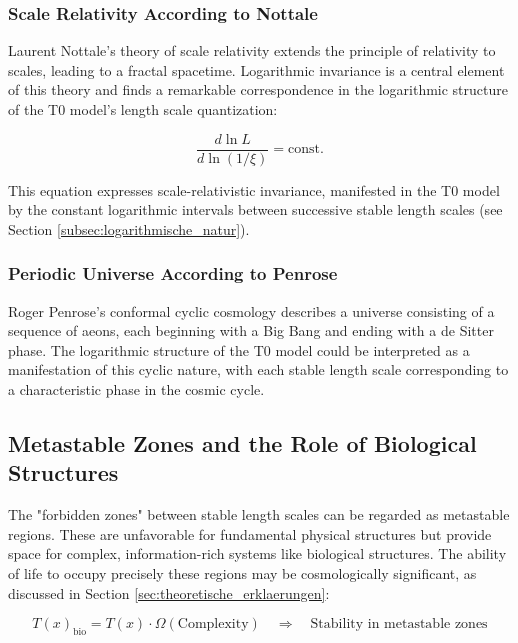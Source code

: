 \documentclass[12pt,a4paper]{article}
\newcommand{\Tfield}{T(x)}
\begin{document}
	\subsubsection{Scale Relativity According to Nottale}
	\label{subsubsec:nottale}
	
	Laurent Nottale's theory of scale relativity \cite{nottale1993} extends the principle of relativity to scales, leading to a fractal spacetime. Logarithmic invariance is a central element of this theory and finds a remarkable correspondence in the logarithmic structure of the T0 model's length scale quantization:
		
		\begin{equation}
			\label{eq:skaleninvarianz}
			\frac{d\ln L}{d\ln(1/\xi)} = \text{const.}
		\end{equation}
		
		This equation expresses scale-relativistic invariance, manifested in the T0 model by the constant logarithmic intervals between successive stable length scales (see Section \ref{subsec:logarithmische_natur}).
		
		\subsubsection{Periodic Universe According to Penrose}
		\label{subsubsec:penrose}
		
		Roger Penrose's conformal cyclic cosmology \cite{penrose2010} describes a universe consisting of a sequence of aeons, each beginning with a Big Bang and ending with a de Sitter phase. The logarithmic structure of the T0 model could be interpreted as a manifestation of this cyclic nature, with each stable length scale corresponding to a characteristic phase in the cosmic cycle.
		
		\subsection{Metastable Zones and the Role of Biological Structures}
		\label{subsec:metastabile_zonen}
		
		The "forbidden zones" between stable length scales can be regarded as metastable regions. These are unfavorable for fundamental physical structures but provide space for complex, information-rich systems like biological structures. The ability of life to occupy precisely these regions may be cosmologically significant, as discussed in Section \ref{sec:theoretische_erklaerungen}:
		
		\begin{equation}
			\label{eq:biostabilisierung}
			\Tfield_{\text{bio}} = \Tfield \cdot \Omega(\text{Complexity}) \quad \Rightarrow \quad \text{Stability in metastable zones}
		\end{equation}
		
\end{document}
